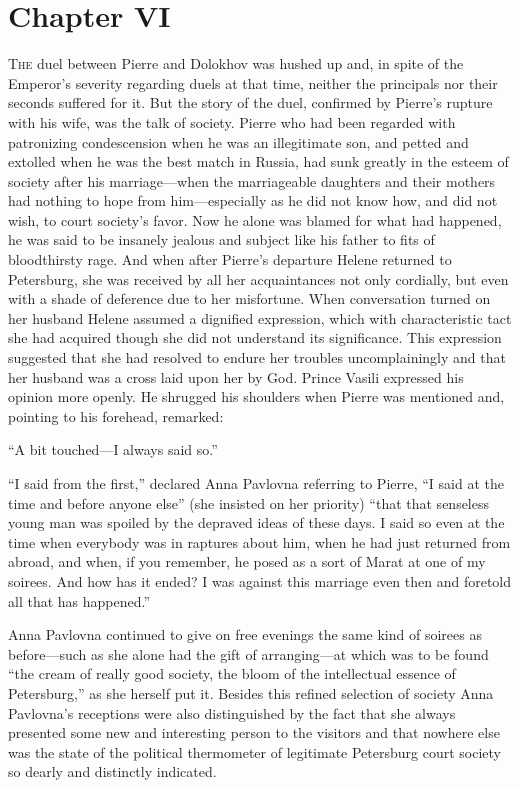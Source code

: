 \chapter*{Chapter VI}
\ifaudio     
{} 
\fi

\lettrine[lines=2, loversize=0.3, lraise=0]{\initfamily T}{he}
duel between Pierre and Dolokhov was hushed up and, in spite
of the Emperor's severity regarding duels at that time, neither
the principals nor their seconds suffered for it. But the story
of the duel, confirmed by Pierre's rupture with his wife, was the
talk of society. Pierre who had been regarded with patronizing
condescension when he was an illegitimate son, and petted and
extolled when he was the best match in Russia, had sunk greatly
in the esteem of society after his marriage---when the
marriageable daughters and their mothers had nothing to hope from
him---especially as he did not know how, and did not wish, to
court society's favor. Now he alone was blamed for what had
happened, he was said to be insanely jealous and subject like his
father to fits of bloodthirsty rage. And when after Pierre's
departure Helene returned to Petersburg, she was received by all
her acquaintances not only cordially, but even with a shade of
deference due to her misfortune.  When conversation turned on her
husband Helene assumed a dignified expression, which with
characteristic tact she had acquired though she did not
understand its significance. This expression suggested that she
had resolved to endure her troubles uncomplainingly and that her
husband was a cross laid upon her by God. Prince Vasili expressed
his opinion more openly. He shrugged his shoulders when Pierre
was mentioned and, pointing to his forehead, remarked:

``A bit touched---I always said so.''

``I said from the first,'' declared Anna Pavlovna referring to
Pierre, ``I said at the time and before anyone else'' (she
insisted on her priority) ``that that senseless young man was
spoiled by the depraved ideas of these days. I said so even at
the time when everybody was in raptures about him, when he had
just returned from abroad, and when, if you remember, he posed as
a sort of Marat at one of my soirees. And how has it ended? I was
against this marriage even then and foretold all that has
happened.''

Anna Pavlovna continued to give on free evenings the same kind of
soirees as before---such as she alone had the gift of
arranging---at which was to be found ``the cream of really good
society, the bloom of the intellectual essence of Petersburg,''
as she herself put it. Besides this refined selection of society
Anna Pavlovna's receptions were also distinguished by the fact
that she always presented some new and interesting person to the
visitors and that nowhere else was the state of the political
thermometer of legitimate Petersburg court society so dearly and
distinctly indicated.

